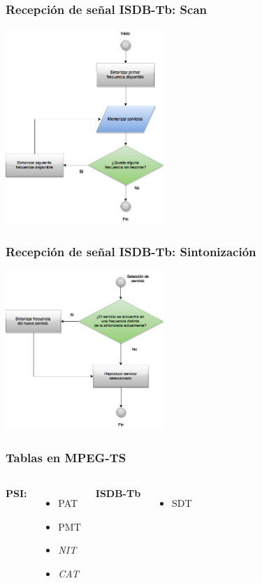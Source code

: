 \documentclass[a4paper,11pt]{beamer}
\begin{document}
			\begin{frame}
				\frametitle{Recepción de señal ISDB-Tb: Scan}
				\begin{center}
					\includegraphics[width=6cm]{proceso_scan.png}
				\end{center}
			\end{frame}

			\begin{frame}
				\frametitle{Recepción de señal ISDB-Tb: Sintonización}
				\begin{center}
					\includegraphics[width=6cm]{proceso_seleccion.png}
				\end{center}
			\end{frame}

			\begin{frame}
				\frametitle{Tablas en MPEG-TS}
				\begin{columns}[c] %
					\textbf{PSI:}\\
					\begin{itemize}
						\item PAT
						\item PMT
						\item \emph{NIT}
						\item \emph{CAT}
					\end{itemize}
					\textbf{ISDB-Tb}
					\begin{itemize}
						\item SDT
					\end{itemize}
			\end{columns}
			\end{frame}
\end{document}
